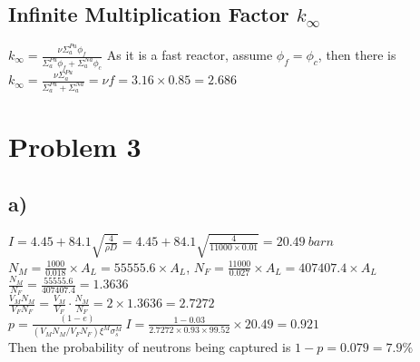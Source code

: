 \documentclass{article}
\begin{document}
\subsection*{Infinite Multiplication Factor \(k_\infty\)}
\(\displaystyle k_\infty =\frac{\nu \Sigma_{a}^{Pu}\phi_f}{\Sigma_a^{Pu}\phi_f+\Sigma_a^{Na}\phi_c}\) As it is a fast reactor, assume \(\phi_f = \phi_c\), then there is
\(\displaystyle k_\infty =\frac{\nu \Sigma_{a}^{Pu}}{\Sigma_a^{Pu}+\Sigma_a^{Na}}=\nu f=3.16\times 0.85 = 2.686\)
\section*{Problem 3}
\subsection*{a)}
\(I = 4.45+84.1\sqrt{\frac{4}{\rho D}}=4.45+84.1\sqrt{\frac{4}{11000\times 0.01}}=20.49 \ barn \)\\
\(\displaystyle N_M= \frac{1000}{0.018}\times A_L=55555.6\times A_L\), \(\displaystyle N_F = \frac{11000}{0.027}\times A_L=407407.4\times A_L\)\\
\(\displaystyle \frac {N_M}{N_F}=\frac{55555.6}{407407.4}=1.3636\)\\
\(\displaystyle \frac{V_MN_M}{V_FN_F}= \frac{V_M}{V_F}\cdot \frac{N_M}{N_F}=2\times 1.3636=2.7272\)
\\\(\displaystyle p =\frac{(1-e)}{(V_MN_M/V_FN_F)\xi^M\sigma^M_s }\ 
I=\frac{1-0.03}{2.7272\times 0.93\times 99.52}\times 20.49=0.921\)\\
Then the probability of neutrons being captured is \(1-p=0.079=7.9\%\)
\end{document}
